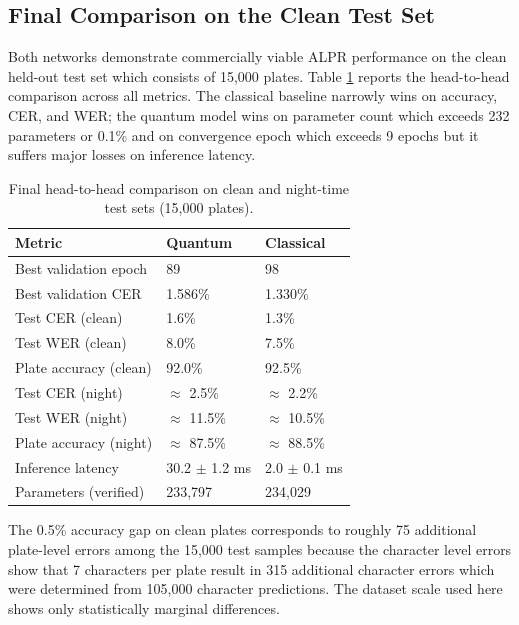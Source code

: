 \documentclass{ieeeaccess}
\begin{document}
\subsection{Final Comparison on the Clean Test Set}
Both networks demonstrate commercially viable ALPR performance on the clean held-out test set which consists of 15,000 plates. Table \ref{tab:comparison} reports the head-to-head comparison across all metrics. The classical baseline narrowly wins on accuracy, CER, and WER; the quantum model wins on parameter count which exceeds 232 parameters or 0.1\% and on convergence epoch which exceeds 9 epochs but it suffers major losses on inference latency.

\begin{table}[h]
\centering
\caption{Final head-to-head comparison on clean and night-time test sets (15,000 plates).}
\label{tab:comparison}
\begin{tabularx}{\columnwidth}{@{}lXX@{}}
\toprule
\textbf{Metric} & \textbf{Quantum} & \textbf{Classical} \\
\midrule
Best validation epoch & 89 & 98 \\
Best validation CER & 1.586\% & 1.330\% \\
Test CER (clean) & 1.6\% & 1.3\% \\
Test WER (clean) & 8.0\% & 7.5\% \\
Plate accuracy (clean) & 92.0\% & 92.5\% \\
Test CER (night) & $\approx$ 2.5\% & $\approx$ 2.2\% \\
Test WER (night) & $\approx$ 11.5\% & $\approx$ 10.5\% \\
Plate accuracy (night) & $\approx$ 87.5\% & $\approx$ 88.5\% \\
Inference latency & 30.2 $\pm$ 1.2 ms & 2.0 $\pm$ 0.1 ms \\
Parameters (verified) & 233,797 & 234,029 \\
\bottomrule
\end{tabularx}
\end{table}

The 0.5\% accuracy gap on clean plates corresponds to roughly 75 additional plate-level errors among the 15,000 test samples because the character level errors show that 7 characters per plate result in 315 additional character errors which were determined from 105,000 character predictions. The dataset scale used here shows only statistically marginal differences.
\end{document}
